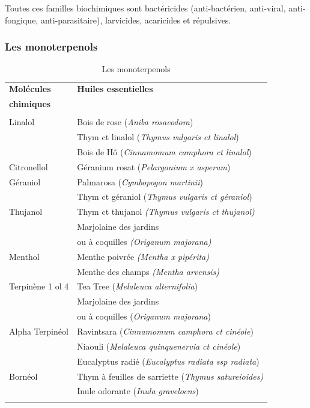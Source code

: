 \documentclass[12pt,a4wide]{article}
\begin{document}
Toutes ces familles biochimiques sont bactéricides (anti-bactérien, anti-viral,
anti-fongique, anti-parasitaire), larvicides, acaricides et répulsives.

\subsubsection{Les monoterpenols}
\label{sec-4-3-1}

\begin{table}[htb]
\caption{Les monoterpenols}
\centering
\begin{tabular}{ll}
\textbf{Molécules} & \textbf{Huiles essentielles}\\
\textbf{chimiques} & \\
\hline
 & \\
Linalol & Bois de rose  (\emph{Aniba rosaeodora})\\
 & Thym ct linalol (\emph{Thymus vulgaris ct linalol})\\
 & Bois de Hô (\emph{Cinnamomum camphora ct linalol})\\
\hline
Citronellol & Géranium rosat (\emph{Pelargonium x asperum})\\
\hline
Géraniol & Palmarosa (\emph{Cymbopogon martinii})\\
 & Thym ct géraniol (\emph{Thymus vulgaris ct géraniol})\\
\hline
Thujanol & Thym ct thujanol \emph{(Thymus vulgaris ct thujanol)}\\
 & Marjolaine des jardins\\
 & ou à coquilles \emph{(Origanum majorana)}\\
\hline
Menthol & Menthe poivrée \emph{(Mentha x pipérita)}\\
 & Menthe des champs \emph{(Mentha arvensis)}\\
\hline
Terpinène 1 ol 4 & Tea Tree (\emph{Melaleuca alternifolia})\\
 & Marjolaine des jardins\\
 & ou à coquilles (\emph{Origanum majorana})\\
\hline
Alpha Terpinéol & Ravintsara (\emph{Cinnamomum camphora ct cinéole})\\
 & Niaouli (\emph{Melaleuca quinquenervia ct cinéole})\\
 & Eucalyptus radié (\emph{Eucalyptus radiata ssp radiata})\\
\hline
Bornéol & Thym à feuilles de sarriette (\emph{Thymus satureioides)}\\
 & Inule odorante (\emph{Inula graveloens})\\
\hline
 & \\
\end{tabular}
\end{table}
\end{document}
